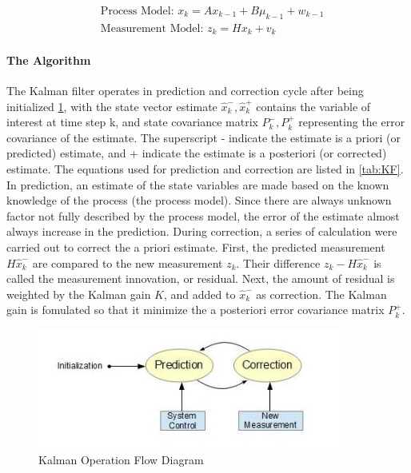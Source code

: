 \begin{align}
&\text{Process Model: }x_k = Ax_{k-1}+B\mu_{k-1}+w_{k-1}\\
&\text{Measurement Model: }z_k = Hx_k+v_k
\end{align}

\paragraph{The Algorithm}
The Kalman filter operates in prediction and correction cycle after
being initialized \ref{figch2:1}, with the state vector estimate
$\hat{x}^-_k, \hat{x}^+_k$ contains the variable of interest at time
step k, and state covariance matrix $P^-_k, P^+_k$ representing the
error covariance of the estimate. The superscript - indicate the
estimate is a priori (or predicted) estimate, and + indicate the
estimate is a posteriori (or corrected) estimate. The equations used
for prediction and correction are listed in \ref{tab:KF}. In
prediction, an estimate of the state variables are made based on the
known knowledge of the process (the process model). Since there are
always unknown factor not fully described by the process model, the
error of the estimate almost always increase in the prediction. During
correction, a series of calculation were carried out to correct the a
priori estimate. First, the predicted measurement $H\hat{x}^-_k$ are
compared to the new measurement $z_k$. Their difference $z_k -
H\hat{x}^-_k$ is called the measurement innovation, or residual. Next,
the amount of residual is weighted by the Kalman gain $K$, and added
to $\hat{x}^-_k$ as correction. The Kalman gain is fomulated so that
it minimize the a posteriori error covariance matrix $P^+_k$. 

\begin{figure}[h]
\centering
\includegraphics[width=10cm, keepaspectratio=true]{./Figures/KalmanOperation.jpg}
\caption{Kalman Operation Flow Diagram}
\label{figch2:1}
\end{figure}

